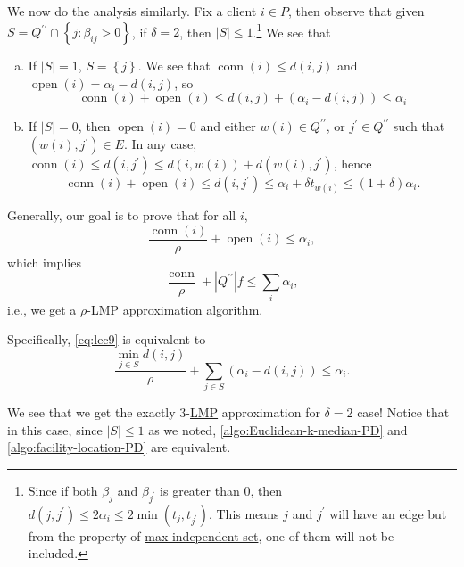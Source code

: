 We now do the analysis similarly. Fix a client \(i\in P\), then observe that given \(S = Q^{\prime\prime} \cap \left\{ j\colon \beta _{ij} > 0 \right\}\), if \(\delta = 2\), then \(\left\vert S \right\vert \leq 1\).\footnote{Since if both \(\beta _j\) and \(\beta _{j^\prime }\) is greater than \(0\), then \(d(j, j^\prime ) \leq 2\alpha _i \leq 2 \min (t_j , t_{j^\prime })\). This means \(j\) and \(j^\prime \) will have an edge but from the property of \hyperref[prb:max-strongly-independent-set]{max independent set}, one of them will not be included.} We see that
\begin{enumerate}[(a)]
	\item If \(\left\vert S \right\vert = 1\), \(S = \left\{ j \right\} \). We see that \(\mathop{\mathrm{conn}}(i) \leq d(i, j)\) and \(\mathop{\mathrm{open}}(i) = \alpha _i - d(i, j)\), so
	      \[
		      \mathop{\mathrm{conn}}(i) + \mathop{\mathrm{open}}(i) \leq d(i, j) + (\alpha _i - d(i, j)) \leq \alpha _i
	      \]
	\item If \(\left\vert S \right\vert = 0\), then \(\mathop{\mathrm{open}}(i) = 0\) and either \(w(i)\in Q^{\prime\prime}\), or \(j^\prime \in Q^{\prime\prime}\) such that \((w(i), j^\prime )\in E\). In any case, \(\mathop{\mathrm{conn}}(i) \leq d(i, j^\prime ) \leq d(i, w(i)) + d(w(i), j^\prime )\), hence
	      \[
		      \mathop{\mathrm{conn}}(i) + \mathop{\mathrm{open}}(i) \leq d(i, j^\prime )\leq \alpha _i + \delta t_{w(i)} \leq (1 + \delta )\alpha _i.
	      \]
\end{enumerate}

Generally, our goal is to prove that for all \(i\),
\begin{equation}\label{eq:lec9}
	\frac{\mathop{\mathrm{conn}}(i)}{\rho} + \mathop{\mathrm{open}}(i) \leq \alpha _i,
\end{equation}
which implies
\[
	\frac{\mathop{\mathrm{conn}}}{\rho } + \left\vert Q^{\prime\prime}\right\vert f \leq \sum_{i} \alpha _i,
\]
i.e., we get a \(\rho \)-\hyperref[def:LMP]{LMP} approximation algorithm.

\begin{note}
	Specifically, \autoref{eq:lec9} is equivalent to
	\[
		\frac{\min _{j\in S}d(i, j)}{\rho } + \sum_{j\in S} (\alpha _i - d(i, j)) \leq \alpha _i.
	\]
\end{note}

\begin{remark}
	We see that we get the exactly \(3\)-\hyperref[def:LMP]{LMP} approximation for \(\delta = 2\) case! Notice that in this case, since \(\left\vert S \right\vert \leq 1\) as we noted, \autoref{algo:Euclidean-k-median-PD} and \autoref{algo:facility-location-PD} are equivalent.
\end{remark}

